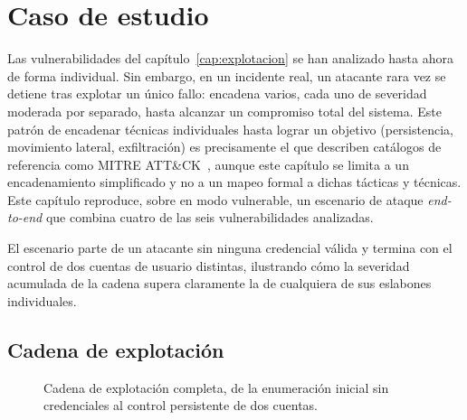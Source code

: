 \chapter{Caso de estudio}
\label{cap:caso-estudio}

Las vulnerabilidades del capítulo~\ref{cap:explotacion} se han analizado
hasta ahora de forma individual. Sin embargo, en un incidente real, un atacante rara vez se
detiene tras explotar un único fallo: encadena varios, cada uno de
severidad moderada por separado, hasta alcanzar un compromiso total del
sistema. Este patrón de encadenar técnicas individuales hasta lograr un
objetivo (persistencia, movimiento lateral, exfiltración) es precisamente el
que describen catálogos de referencia como MITRE ATT\&CK~,
aunque este capítulo se limita a un encadenamiento simplificado y no a un
mapeo formal a dichas tácticas y técnicas. Este capítulo reproduce, sobre
\breachlab en modo vulnerable, un
escenario de ataque \emph{end-to-end} que combina cuatro de las seis
vulnerabilidades analizadas.

El escenario parte de un atacante sin ninguna credencial válida y termina
con el control de dos cuentas de usuario distintas, ilustrando cómo la
severidad acumulada de la cadena supera claramente la de cualquiera de sus
eslabones individuales.

\section{Cadena de explotación}

\begin{figure}[htbp]
  \centering
  \caption{Cadena de explotación completa, de la enumeración inicial sin
    credenciales al control persistente de dos cuentas.}
  \label{fig:cadena}
\end{figure}

